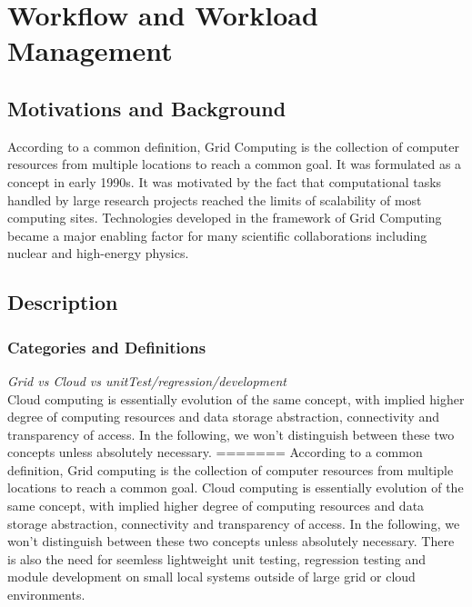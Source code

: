 \section{Workflow and Workload Management}

\subsection{Motivations and Background}
According to a common definition, Grid Computing is the collection of computer resources from multiple locations to reach a common goal. 
It was formulated as a concept in early 1990s. It was motivated by the fact that computational tasks handled by large research projects reached the limits of scalability of most computing sites. Technologies developed in the framework of Grid Computing became a major enabling factor for many scientific collaborations including nuclear and high-energy physics.

\subsection{Description}
\subsubsection{Categories and Definitions}

\textit{Grid vs Cloud vs unitTest/regression/development}
\\

Cloud computing is essentially evolution of the same concept, with implied higher degree of computing resources and data storage abstraction, connectivity and transparency of access. In the following, we won't distinguish between these two concepts unless absolutely necessary.
=======
According to a common definition, Grid computing is the collection of computer resources from multiple locations to reach a common goal. Cloud computing is essentially evolution of the same concept, with implied higher degree of computing resources and data storage abstraction, connectivity and transparency of access. In the following, we won't distinguish between these two concepts unless absolutely necessary.  There is also the need for seemless lightweight unit testing, regression testing and module development on small local systems outside of large grid or cloud environments.

